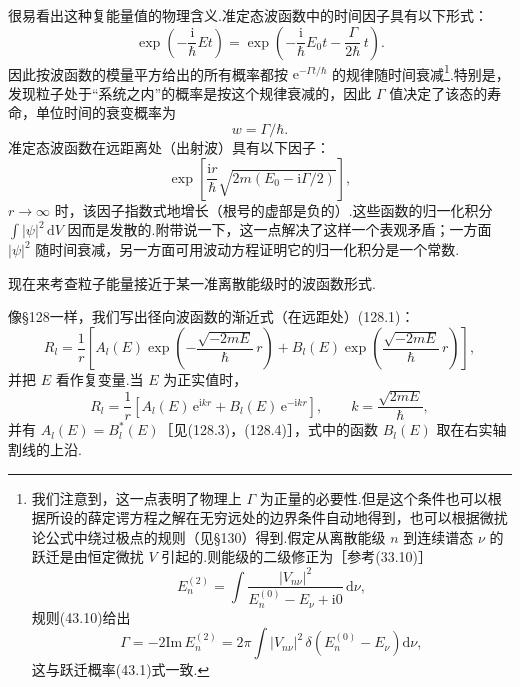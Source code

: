 很易看出这种复能量值的物理含义.准定态波函数中的时间因子具有以下形式：
\begin{equation*}
  \exp\left(-\frac{\mathrm{i}}{\hbar}Et\right)
  =\exp\left(-\frac{\mathrm{i}}{\hbar}E_0t-\frac{\Gamma}{2\hbar}\,t\right).
\end{equation*}
因此按波函数的模量平方给出的所有概率都按 $\mathrm{e}^{-\Gamma t/\hbar}$ 的规律随时间衰减\footnote{我们注意到，这一点表明了物理上 $\Gamma$ 为正量的必要性.但是这个条件也可以根据所设的薛定谔方程之解在无穷远处的边界条件自动地得到，也可以根据微扰论公式中绕过极点的规则（见§130）得到.假定从离散能级 $n$ 到连续谱态 $\nu$ 的跃迁是由恒定微扰 $V$ 引起的.则能级的二级修正为［参考(33.10)］
\begin{equation*}
  E_n^{(2)}=\int\frac{|V_{n\nu}|^2}{E_n^{(0)}-E_\nu+\mathrm{i}0}\,\mathrm{d}\nu,
\end{equation*}
规则(43.10)给出
\begin{equation*}
  \Gamma=-2\mathrm{Im}\,E_n^{(2)}
  =2\pi\int|V_{n\nu}|^2\,\delta\left(E_n^{(0)}-E_\nu\right)\mathrm{d}\nu,
\end{equation*}
这与跃迁概率(43.1)式一致.}.特别是，发现粒子处于“系统之内”的概率是按这个规律衰减的，因此 $\Gamma$ 值决定了该态的寿命，单位时间的衰变概率为
\begin{equation}
  w=\Gamma/\hbar.
\end{equation}
准定态波函数在远距离处（出射波）具有以下因子：
\begin{equation*}
  \exp\left[\frac{\mathrm{i}r}{\hbar}
  \sqrt{2m\left(E_0-\mathrm{i}\Gamma/2\right)}\right],
\end{equation*}
$r\to\infty$ 时，该因子指数式地增长（根号的虚部是负的）.这些函数的归一化积分 $\int|\psi|^2\,\mathrm{d}V$ 因而是发散的.附带说一下，这一点解决了这样一个表观矛盾；一方面 $|\psi|^2$ 随时间衰减，另一方面可用波动方程证明它的归一化积分是一个常数.

现在来考查粒子能量接近于某一准离散能级时的波函数形式.

像§128一样，我们写出径向波函数的渐近式（在远距处）(128.1)：
\begin{equation}
  R_l=\frac{1}{r}\left[A_l(E)
  \exp\left(-\frac{\sqrt{-2mE}}{\hbar}\,r\right)
  +B_l(E)\exp\left(\frac{\sqrt{-2mE}}{\hbar}\,r\right)\right],
\end{equation}
并把 $E$ 看作复变量.当 $E$ 为正实值时，
\begin{equation}
  R_l=\frac{1}{r}\left[A_l(E)\,\mathrm{e}^{\mathrm{i}kr}
  +B_l(E)\,\mathrm{e}^{-\mathrm{i}kr}\right],
  \qquad k=\frac{\sqrt{2mE}}{\hbar},
\end{equation}
并有 $A_l(E)=B_l^{*}(E)$［见(128.3)，(128.4)］，式中的函数 $B_l(E)$ 取在右实轴割线的上沿.

